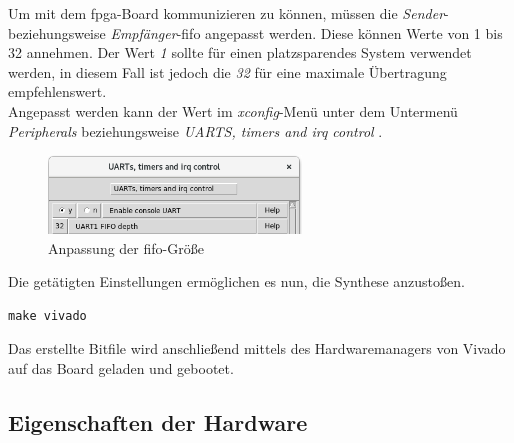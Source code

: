 Um mit dem \ac{fpga}-Board kommunizieren zu können, müssen die \emph{Sender}- beziehungsweise \emph{Empfänger}-\ac{fifo} angepasst werden. Diese können Werte von 1 bis 32 annehmen.
Der Wert \emph{1} sollte für einen platzsparendes System verwendet werden, in diesem Fall ist jedoch die \emph{32} für eine maximale Übertragung empfehlenswert.\\
Angepasst werden kann der Wert im \emph{xconfig}-Menü unter dem Untermenü \emph{Peripherals} beziehungsweise \glqq \emph{UARTS, timers and irq control} \grqq{}.\\

\begin{figure}[H]
\centering
\includegraphics[width=0.6\textwidth]{Hauptteil/fifodepth.png}
\caption{Anpassung der \ac{fifo}-Größe}
\label{fig:fifodepth}
\end{figure}




Die getätigten Einstellungen ermöglichen es nun, die Synthese anzustoßen.\\

\begin{lstlisting}[caption={Aufruf des Vivado-Programm },label={code:vivado}]
make vivado
   \end{lstlisting}






Das erstellte Bitfile wird anschließend mittels des Hardwaremanagers von Vivado auf das Board geladen und gebootet.\\



\subsection{Eigenschaften der Hardware}\label{kap:hardwareeigenschaften}


